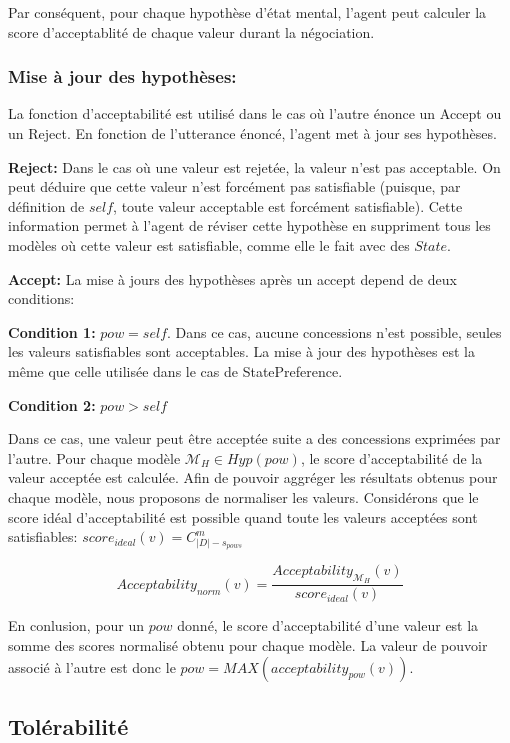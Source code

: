 \documentclass[runningheads,a4paper]{llncs}
\begin{document}
Par conséquent, pour chaque hypothèse d'état mental, l'agent peut calculer la score d'acceptablité de chaque valeur durant la négociation.

\subsubsection{Mise à jour des hypothèses:}

La fonction d'acceptabilité est utilisé dans le cas où l'autre énonce un Accept ou un Reject. En fonction de l'utterance énoncé, l'agent met à jour ses hypothèses. 

\textbf{Reject:} Dans le cas où une valeur est rejetée, la valeur n'est pas acceptable. On peut déduire que cette valeur n'est forcément pas satisfiable (puisque, par définition de $self$, toute valeur acceptable est forcément satisfiable). Cette information permet à l'agent de réviser cette hypothèse en suppriment tous les modèles où cette valeur est satisfiable, comme elle le fait avec des $State$.

\textbf{Accept:} La mise à jours des hypothèses après un accept depend de deux conditions:

\textbf{Condition 1:} $pow = self$. 
Dans ce cas, aucune concessions n'est possible, seules les valeurs satisfiables sont acceptables. La mise à jour des hypothèses est la même que celle utilisée dans le cas de StatePreference.

\textbf{Condition 2:} $pow > self$ 

Dans ce cas, une valeur peut être acceptée suite a des concessions exprimées par l'autre. Pour chaque modèle $\mathcal{M}_H\in Hyp(pow)$, le score d'acceptabilité de la valeur acceptée est calculée. Afin de pouvoir aggréger les résultats obtenus pour chaque modèle, nous proposons de normaliser les valeurs. Considérons que le score idéal d'acceptabilité est possible quand toute les valeurs acceptées sont satisfiables:
$ score_{ideal}(v) = C^{m}_{|D| - s_{pows}}$ 

	\begin{equation}
		Acceptability_{norm} (v)  = \frac{Acceptability_{\mathcal{M}_H}(v)}{score_{ideal}(v)}
	\end{equation}

En conlusion, pour un $pow$ donné, le score d'acceptabilité d'une valeur est la somme des scores normalisé obtenu pour chaque modèle. La valeur de pouvoir associé à l'autre est donc le $  pow = MAX(acceptability_{pow}(v)).$


\subsection{Tolérabilité}
\end{document}
